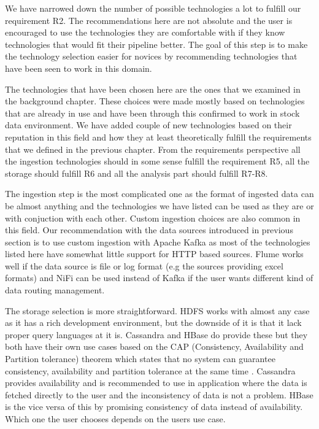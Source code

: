 We have narrowed down the number of possible technologies a lot to fulfill our requirement R2.
The recommendations here are not absolute and the user is encouraged to use the technologies they are comfortable with if they know technologies that would fit their pipeline better.
The goal of this step is to make the technology selection easier for novices by recommending technologies that have been seen to work in this domain.

The technologies that have been chosen here are the ones that we examined in the background chapter.
These choices were made mostly based on technologies that are already in use and have been through this confirmed to work in stock data environment.
We have added couple of new technologies based on their reputation in this field and how they at least theoretically fulfill the requirements that we defined in the previous chapter.
From the requirements perspective all the ingestion technologies should in some sense fulfill the requirement R5, all the storage should fulfill R6 and all the analysis part should fulfill R7-R8.

The ingestion step is the most complicated one as the format of ingested data can be almost anything and the technologies we have listed can be used as they are or with conjuction with each other.
Custom ingestion choices are also common in this field.
Our recommendation with the data sources introduced in previous section is to use custom ingestion with Apache Kafka as most of the technologies listed here have somewhat little support for HTTP based sources.
Flume works well if the data source is file or log format (e.g the sources providing excel formats) and NiFi can be used instead of Kafka if the user wants different kind of data routing management.

The storage selection is more straightforward.
HDFS works with almost any case as it has a rich development environment, but the downside of it is that it lack proper query languages at it is.
Cassandra and HBase do provide these but they both have their own use cases based on the CAP (Consistency, Availability and Partition tolerance) theorem which states that no system can guarantee consistency, availability and partition tolerance at the same time \cite{cap}.
Cassandra provides availability and is recommended to use in application where the data is fetched directly to the user and the inconsistency of data is not a problem.
HBase is the vice versa of this by promising consistency of data instead of availability.
Which one the user chooses depends on the users use case.

